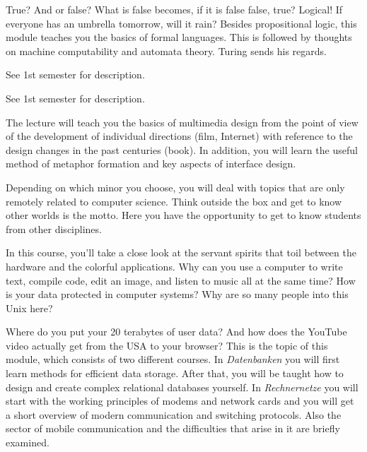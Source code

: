 True?
And or false?
What is false becomes, if it is false false, true?
Logical!
If everyone has an umbrella tomorrow, will it rain?
Besides propositional logic, this module teaches you the basics of formal languages.
This is followed by thoughts on machine computability and automata theory.
Turing sends his regards.

See 1st semester for description.

See 1st semester for description.

The lecture will teach you the basics of multimedia design from the point of view of the development of individual directions (film, Internet) with reference to the design changes in the past centuries (book).
In addition, you will learn the useful method of metaphor formation and key aspects of interface design.

\newpage

Depending on which minor you choose, you will deal with topics that are only remotely related to computer science.
Think outside the box and get to know other worlds is the motto.
Here you have the opportunity to get to know students from other disciplines.

In this course, you'll take a close look at the servant spirits that toil between the hardware and the colorful applications.
Why can you use a computer to write text, compile code, edit an image, and listen to music all at the same time?
How is your data protected in computer systems?
Why are so many people into this Unix here?


Where do you put your 20 terabytes of user data? And how does the YouTube video actually get from the USA to your browser?
This is the topic of this module, which consists of two different courses.
In \textit{Datenbanken} you will first learn methods for efficient data storage.
After that, you will be taught how to design and create complex relational databases yourself.
In \textit{Rechnernetze} you will start with the working principles of modems and network cards and you will get a short overview of modern communication and switching protocols.
Also the sector of mobile communication and the difficulties that arise in it are briefly examined.

